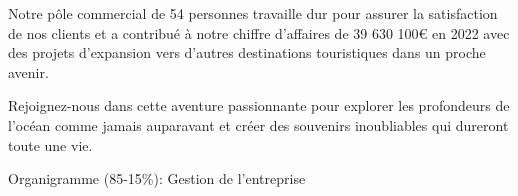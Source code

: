 \documentclass[11pt, openright]{book}
\begin{document}
Notre pôle commercial de 54 personnes travaille dur pour assurer la satisfaction de nos clients et a contribué à notre chiffre d'affaires de 39 630 100€ en 2022 avec des projets d'expansion vers d'autres destinations touristiques dans un proche avenir.

Rejoignez-nous dans cette aventure passionnante pour explorer les profondeurs de l'océan comme jamais auparavant et créer des souvenirs inoubliables qui dureront toute une vie.

\newpage

	\begin{dent}{Organigramme (85-15\%):} Gestion de l'entreprise

		\begin{figure}[!ht]
			\centering
		\end{figure}
		
	\end{dent}




	
    
\end{document}
